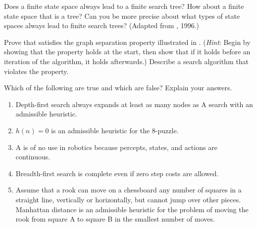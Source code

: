 \begin{iexercise}
Does a finite state space always lead to a finite search tree?  How about a 
finite state space that is a tree?  Can you be more precise about what types 
of state spaces always lead to finite search trees? (Adapted from , 1996.)
\end{iexercise} 

\begin{exercise}
Prove that  satisfies the graph separation property illustrated in .
({\em Hint}: Begin by showing that the property holds at the start, then show that if it holds before an iteration of the algorithm, it holds afterwards.) 
Describe a search algorithm that violates the property.
\end{exercise} 



\begin{exercise}
Which of the following are true and which are false? Explain your answers.
\begin{enumerate}
\item Depth-first search always expands at least as many nodes
as A{\star} search with an admissible heuristic.
\item \(h(n)=0\) is an admissible heuristic for the 8-puzzle.
\item A{\star} is of no use in robotics because percepts, states, and actions are continuous.
\item Breadth-first search is complete even if zero step costs are allowed.
\item Assume that a rook can move on a chessboard any number of squares in a straight line,
vertically or horizontally, but cannot jump over other pieces. Manhattan distance
is an admissible heuristic for the problem of moving the rook from square A to square B
in the smallest number of moves.
\end{enumerate}
\end{exercise} 

